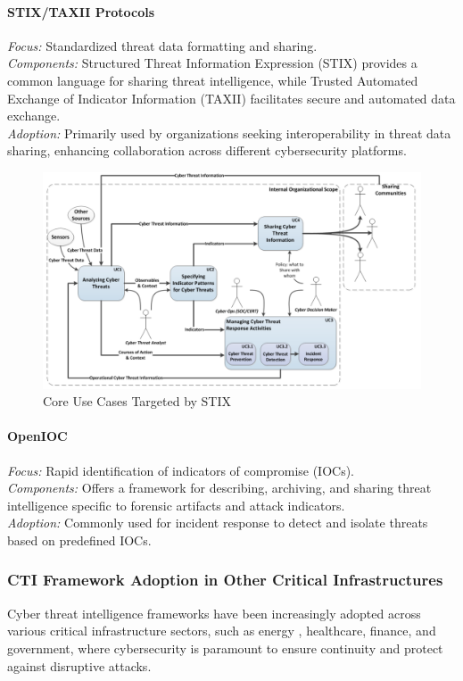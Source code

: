 \documentclass[a4paper,twoside,12pt]{report}
\begin{document}
\paragraph{STIX/TAXII Protocols \citet{provatas2023standards}}
\textit{Focus:} Standardized threat data formatting and sharing. \\
\textit{Components:} Structured Threat Information Expression (STIX) provides a common language for sharing threat intelligence, while Trusted Automated Exchange of Indicator Information (TAXII) facilitates secure and automated data exchange. \\
\textit{Adoption:} Primarily used by organizations seeking interoperability in threat data sharing, enhancing collaboration across different cybersecurity platforms.
\begin{figure}[ht]
    \centering
    \includegraphics[width=1.0\linewidth]{images/stix-system.png}  %
    \caption{\citep{barnum2012standardizing} Core Use Cases Targeted by STIX}
    \label{fig:thing1}
\end{figure}
\paragraph{OpenIOC \citet{janotistrategic}}
\textit{Focus:} Rapid identification of indicators of compromise (IOCs). \\
\textit{Components:} Offers a framework for describing, archiving, and sharing threat intelligence specific to forensic artifacts and attack indicators. \\
\textit{Adoption:} Commonly used for incident response to detect and isolate threats based on predefined IOCs.

\subsubsection*{CTI Framework Adoption in Other Critical Infrastructures \citet{kayode2023applications}}
Cyber threat intelligence frameworks have been increasingly adopted across various critical infrastructure sectors, such as energy \citet{gong2021cyber}, healthcare, finance, and government, where cybersecurity is paramount to ensure continuity and protect against disruptive attacks.
\end{document}
